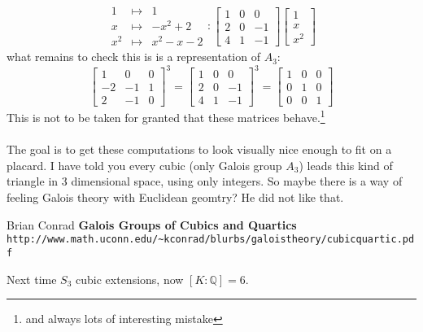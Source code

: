 \documentclass[12pt]{article}
\begin{document}
$$\begin{array}{ccccc}
1 & \mapsto & 1 \\
x & \mapsto & - x^2 + 2 \\
x^2 & \mapsto  & x^2 - x - 2 
\end{array}  :
\left[ 
\begin{array}{rrr} 1 &  0 & 0 \\
2 & 0 & -1 \\ 4 & 1 & -1\end{array}\right]
\left[ \begin{array}{l} 1 \\ x \\ x^2 \end{array}\right]$$
what remains to check this is is a representation of $A_3$:
$$ \left[ 
\begin{array}{rrr} 1 &  0 & 0 \\
-2 & -1 & 1 \\ 2 & -1 & 0\end{array}\right]^3 =  \left[ 
\begin{array}{rrr} 1 &  0 & 0 \\
2 & 0 & -1 \\ 4 & 1 & -1\end{array}\right]^3 = 
\left[ 
\begin{array}{rrr} 1 &  0 & 0 \\
0 & 1 & 0  \\ 0 & 0 & 1 \end{array}\right]$$ 
This is not to be taken for granted that these matrices behave.\footnote{and always lots of interesting mistake} \\\\
The goal is to get these computations to look visually nice enough to fit on a placard.  I have told you every cubic (only Galois group $A_3$) leads this kind of triangle in 3 dimensional space, using only integers.  So maybe there is a way of feeling Galois theory with Euclidean geomtry?  He did not like that.

\vfill

\begin{thebibliography}{}

\item Brian Conrad \textbf{Galois Groups of Cubics and Quartics} \\ \texttt{http://www.math.uconn.edu/\~{}kconrad/blurbs/galoistheory/cubicquartic.pdf}
 
\end{thebibliography} 

Next time $S_3$ cubic extensions, now $[K:\mathbb{Q}]= 6$.
\end{document}
